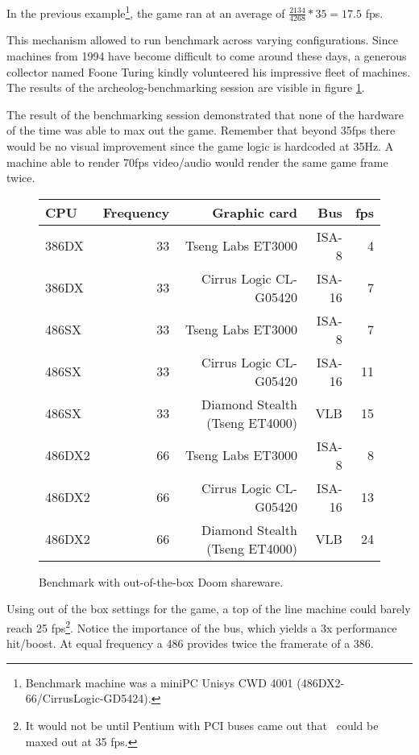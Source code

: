 \par
In the previous example\footnote{Benchmark machine was a miniPC Unisys CWD 4001 (486DX2-66/CirrusLogic-GD5424).}, the game ran at an average of $\frac{2134}{4268}*35 = 17.5$ fps. \\
\par
This mechanism allowed to run benchmark across varying configurations. Since machines from 1994 have become difficult to come around these days, a generous collector named Foone Turing kindly volunteered his impressive fleet of machines. The results of the archeolog-benchmarking session are visible in figure \ref{bnechmarsks}.\\
\par
 The result of the benchmarking session demonstrated that none of the hardware of the time was able to max out the game. Remember that beyond 35fps there would be no visual improvement since the game logic is hardcoded at 35Hz. A machine able to render 70fps video/audio would render the same game frame twice.\\
\par
\begin{figure}[H]
\centering  
\begin{tabularx}{\textwidth}{ L{1}  R{0.3} R{2.4} R{1} R{0.3} }
  \toprule
   \textbf{CPU} & \textbf{Frequency} & \textbf{Graphic card} & \textbf{Bus} & \textbf{fps}\\
  \toprule 
  386DX & 33 & Tseng Labs ET3000    & ISA-8  &  4\\
  386DX\protect\footnotemark & 33 & Cirrus Logic CL-G05420 & ISA-16 &  7\\
  \toprule 
  486SX & 33 & Tseng Labs ET3000                & ISA-8  &  7\\
  486SX & 33 & Cirrus Logic CL-G05420           & ISA-16 & 11\\ 
  486SX & 33 & Diamond Stealth (Tseng ET4000)   & VLB    & 15\\
  \toprule 
  486DX2 & 66 & Tseng Labs ET3000               & ISA-8  &  8\\
  486DX2 & 66 & Cirrus Logic CL-G05420          & ISA-16 & 13\\
  486DX2 & 66 & Diamond Stealth (Tseng ET4000)  & VLB    & 24\\
   \toprule
 \end{tabularx}
\caption{Benchmark with out-of-the-box Doom shareware.}
\label{bnechmarsks}
\end{figure}
\par
Using out of the box settings for the game, a top of the line machine could barely reach 25 fps\footnote{It would not be until Pentium with PCI buses came out that \doom~could be maxed out at 35 fps.}. Notice the importance of the bus, which yields a 3x performance hit/boost. At equal frequency a 486 provides twice the framerate of a 386.\\
\par






